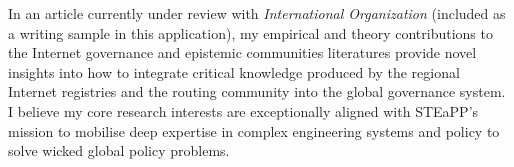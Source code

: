 \documentclass[11pt]{letter}
\begin{document}
\begin{letter}
%
%
%
%
In an article currently under review with \emph{International Organization} (included as a writing sample in this application), my empirical and theory contributions to the Internet governance and epistemic communities literatures provide novel insights into how to integrate critical knowledge produced by  the regional Internet registries and the routing community into the global governance system.
%
%
%
I believe my core research interests are exceptionally aligned with STEaPP's mission to mobilise deep expertise in complex engineering systems and policy to solve wicked global policy problems.


\end{letter}
\end{document}
